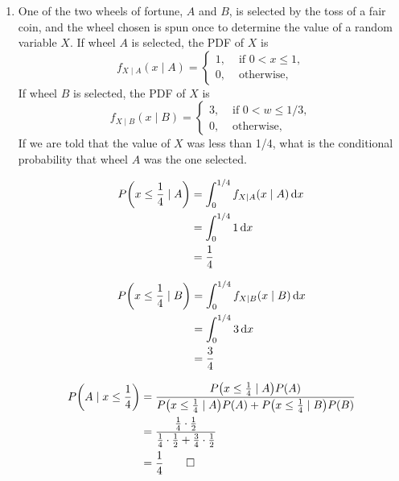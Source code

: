 \documentclass[paper=usletter, fontsize=12pt]{article}
\begin{document}
\begin{enumerate}
\begin{cproof}
        \end{cproof}

        \item One of the two wheels of fortune, $A$ and $B$, is selected by the
        toss of a fair coin, and the wheel chosen is spun once to determine the
        value of a random variable $X$. If wheel $A$ is selected, the PDF of
        $X$ is
        \begin{equation*}
            f_{X\mid A}(x\mid A) = \begin{cases}
                1, & \text{ if } 0 < x \le 1,\\
                0, & \text{ otherwise, }
            \end{cases}
        \end{equation*}
        If wheel $B$ is selected, the PDF of $X$ is
        \begin{equation*}
            f_{X\mid B}(x\mid B) = \begin{cases}
                3, & \text{ if } 0 < w \le 1/3,\\
                0, & \text{ otherwise, }
            \end{cases}
        \end{equation*}
        If we are told that the value of $X$ was less than 1/4, what is the
        conditional probability that wheel $A$ was the one selected.
        \begin{cproof}

            \begin{align*}
                P\bigg(x \le \frac{1}{4} \mid A \bigg) &= \int_{0}^{1/4}f_{X\mid A}(x\mid A) \mathop{}\!\mathrm{d} x \\
                & = \int_{0}^{1/4}1 \mathop{}\!\mathrm{d} x\\
                & = \frac{1}{4}
            \end{align*}
            \endgroup

            \begin{align*}
                P\bigg(x \le \frac{1}{4} \mid B \bigg) &= \int_{0}^{1/4}f_{X\mid B}(x\mid B) \mathop{}\!\mathrm{d} x \\
                & = \int_{0}^{1/4}3 \mathop{}\!\mathrm{d} x\\
                & = \frac{3}{4}
            \end{align*}
            \endgroup

            \begin{align*}
                P\bigg(A \mid x \le \frac{1}{4}\bigg) &= \frac{P\big(x \le \frac{1}{4} \mid A\big)P(A)}{P\big(x \le \frac{1}{4} \mid A\big)P(A) + P\big(x \le \frac{1}{4} \mid B\big)P(B)}\\
                &= \frac{\frac{1}{4}\cdot \frac{1}{2}}{\frac{1}{4}\cdot \frac{1}{2} + \frac{3}{4}\cdot \frac{1}{2}}\\
                & = \frac{1}{4} \qedhere
            \end{align*}
            \endgroup

        \end{cproof}

    \end{enumerate}
\end{document}
